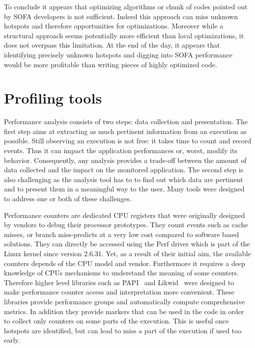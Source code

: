 To conclude it appears that optimizing algorithms or chunk of codes pointed out by \gls{SOFA} developers is not sufficient.
Indeed this approach can miss unknown hotspots and therefore opportunities for optimizations.
Moreover while a structural approach seems potentially more efficient than local optimizations, it does not overpass this limitation.
At the end of the day, it appears that identifying precisely unknown hotspots and digging into \gls{SOFA} performance would be more profitable than writing pieces of highly optimized code.

\section{Profiling tools}
\label{sec:prof-tools}

Performance analysis consists of two steps: data collection and presentation.
The first step aims at extracting as much pertinent information from an execution as possible.
Still observing an execution is not free: it takes time to count and record events.
Thus it can impact the application performances or, worst, modify its behavior.
Consequently, any analysis provides a trade-off between the amount of data collected and the impact on the monitored application.
The second step is also challenging as the analysis tool has to to find out which data are pertinent and to present them in a meaningful way to the user.
Many tools were designed to address one or both of these challenges.

Performance counters are dedicated \gls{CPU} registers that were originally designed by vendors to debug their processor prototypes.
They count events such as cache misses, or branch miss-predicts at a very low cost compared to software based solutions.
They can directly be accessed using the \gls{Perf} driver which is part of the \gls{Linux} kernel since version $2.6.31$.
Yet, as a result of their initial aim, the available counters depends of the \gls{CPU} model and vendor.
Furthermore it requires a deep knowledge of \glspl{CPU} mechanisms to understand the meaning of some counters.
Therefore higher level libraries such as \gls{PAPI}~\cite{Browne00Portable,Malony11Parallel,Weaver13PAPI} and \gls{Likwid}~\cite{Treibig10LIKWID} were designed to make performance counter access and interpretation more convenient.
These libraries provide performance groups and automatically compute comprehensive metrics.
In addition they provide markers that can be used in the code in order to collect only counters on some parts of the execution.
This is useful once hotspots are identified, but can lead to miss a part of the execution if used too early.

